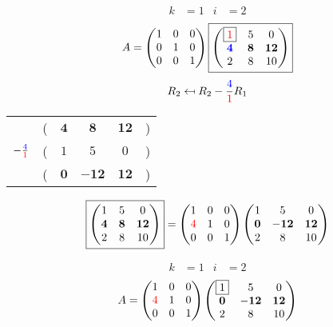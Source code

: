 \documentclass[pdf]{beamer}
\begin{document}
\begin{frame}{}\begin{align*} k &= 1 & i &= 2 \end{align*} $$A=\begin{pmatrix}1&0&0\\0&1&0\\0&0&1\end{pmatrix} \boxed{\begin{pmatrix}\boxed{{\color{red}1}}&5&0\\\mathbf{{\color{blue}4}}&\mathbf{8}&\mathbf{12}\\2&8&10\end{pmatrix}} $$ $$R_2 \mapsfrom R_2 - \frac{{\color{blue}4}}{{\color{red}1}} R_1$$ \begin{center}\begin{tabular}{cccccc}  &(& $ \mathbf{4} $ & $ \mathbf{8} $ & $ \mathbf{12} $ &)\\$ -\frac{{\color{blue}4}}{{\color{red}1}} $&(& $ 1 $ & $ 5 $ & $ 0 $ &)\\\hline  &(& $ \mathbf{0} $ & $ \mathbf{-12} $ & $ \mathbf{12} $ &) \end{tabular}\end{center} $$ \boxed{\begin{pmatrix}1&5&0\\\mathbf{4}&\mathbf{8}&\mathbf{12}\\2&8&10\end{pmatrix}} = \begin{pmatrix}1&0&0\\{\color{red}4}&1&0\\0&0&1\end{pmatrix} \begin{pmatrix}1&5&0\\\mathbf{0}&\mathbf{-12}&\mathbf{12}\\2&8&10\end{pmatrix} $$\end{frame}
\begin{frame}{}\begin{align*} k &= 1 & i &= 2 \end{align*}$$A=\begin{pmatrix}1&0&0\\{\color{red}4}&1&0\\0&0&1\end{pmatrix} \begin{pmatrix}\boxed{1}&5&0\\\mathbf{0}&\mathbf{-12}&\mathbf{12}\\2&8&10\end{pmatrix} $$\end{frame}
\end{document}
